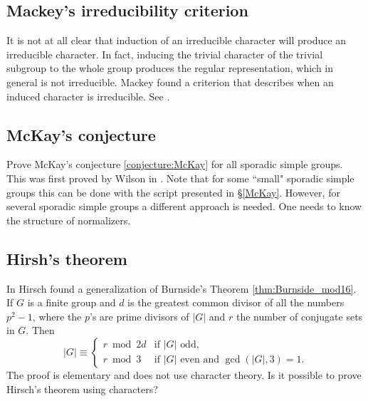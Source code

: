 \subsection*{Mackey's irreducibility criterion}

It is not at all clear that 
induction of an irreducible character will produce an irreducible character. In fact, 
inducing the trivial character of the trivial subgroup to the whole group produces the 
regular representation, which in general is not irreducible. Mackey found a criterion 
that describes when an induced character is irreducible. See \cite[\S8.3]{MR2867444}. 

\subsection*{McKay's conjecture}

Prove McKay's conjecture \ref{conjecture:McKay} for all sporadic simple groups. 
This was first proved by Wilson in \cite{MR1643110}. 
Note that
for some ``small" sporadic simple groups this can be done
with the script presented in \S\ref{McKay}. However, 
for several sporadic simple groups a different approach is needed. One needs
to know the structure of normalizers. 




\subsection*{Hirsh's theorem}

In \cite{MR36755} Hirsch found a generalization of Burnside's Theorem \ref{thm:Burnside_mod16}.  
If $G$ is a finite group and $d$ is the greatest common divisor of all 
the numbers $p^2-1$, where the $p$'s are prime divisors of $|G|$ and $r$ the number of conjugate sets in $G$. Then 
\[
|G|\equiv\begin{cases} 
    r\bmod 2d &\text{if $|G|$ odd,}\\
    r\bmod 3 & \text{if $|G|$ even and $\gcd(|G|,3)=1$.}
    \end{cases}
\]
The proof is elementary and does not use character theory. Is it possible
to prove Hirsch's theorem using characters?

